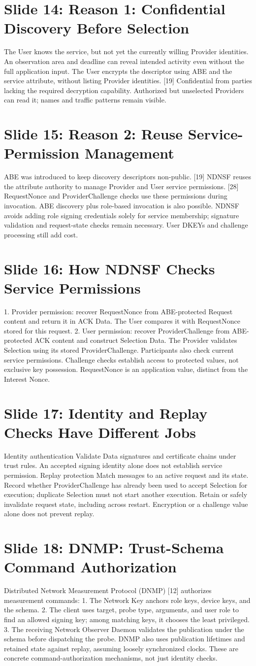 \documentclass[11pt]{article}
\newcommand{\slideentry}[3]{\section*{Slide #1: #2}#3\par}
\begin{document}
\slideentry{14}{Reason 1: Confidential Discovery Before Selection}{
The User knows the service, but not yet the currently willing Provider identities. An observation area and deadline can reveal intended activity even without the full application input. The User encrypts the descriptor using ABE and the service attribute, without listing Provider identities. [19] Confidential from parties lacking the required decryption capability. Authorized but unselected Providers can read it; names and traffic patterns remain visible.
}
\slideentry{15}{Reason 2: Reuse Service-Permission Management}{
ABE was introduced to keep discovery descriptors non-public. [19] NDNSF reuses the attribute authority to manage Provider and User service permissions. [28] RequestNonce and ProviderChallenge checks use these permissions during invocation. ABE discovery plus role-based invocation is also possible. NDNSF avoids adding role signing credentials solely for service membership; signature validation and request-state checks remain necessary. User DKEYs and challenge processing still add cost.
}
\slideentry{16}{How NDNSF Checks Service Permissions}{
1. Provider permission: recover RequestNonce from ABE-protected Request content and return it in ACK Data. The User compares it with RequestNonce stored for this request. 2. User permission: recover ProviderChallenge from ABE-protected ACK content and construct Selection Data. The Provider validates Selection using its stored ProviderChallenge. Participants also check current service permissions. Challenge checks establish access to protected values, not exclusive key possession. RequestNonce is an application value, distinct from the Interest Nonce.
}
\slideentry{17}{Identity and Replay Checks Have Different Jobs}{
Identity authentication Validate Data signatures and certificate chains under trust rules. An accepted signing identity alone does not establish service permission. Replay protection Match messages to an active request and its state. Record whether ProviderChallenge has already been used to accept Selection for execution; duplicate Selection must not start another execution. Retain or safely invalidate request state, including across restart. Encryption or a challenge value alone does not prevent replay.
}
\slideentry{18}{DNMP: Trust-Schema Command Authorization}{
Distributed Network Measurement Protocol (DNMP) [12] authorizes measurement commands: 1. The Network Key anchors role keys, device keys, and the schema. 2. The client uses target, probe type, arguments, and user role to find an allowed signing key; among matching keys, it chooses the least privileged. 3. The receiving Network Observer Daemon validates the publication under the schema before dispatching the probe. DNMP also uses publication lifetimes and retained state against replay, assuming loosely synchronized clocks. These are concrete command-authorization mechanisms, not just identity checks.
}
\end{document}
